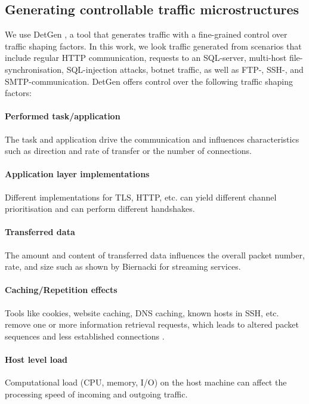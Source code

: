 \documentclass[conference]{IEEEtran}
\begin{document}
\subsection{Generating controllable traffic microstructures}\label{Control}

We use DetGen \cite{clausen2020traffic}, a tool that generates traffic with a fine-grained control over traffic shaping factors. In this work, we look traffic generated from scenarios that include regular HTTP communication, requests to an SQL-server, multi-host file-synchronisation, SQL-injection attacks, botnet traffic, as well as FTP-, SSH-, and SMTP-communication. DetGen offers control over the following traffic shaping factors:
 
\paragraph{Performed task/application}
The task and application drive the communication and influences characteristics such as direction and rate of transfer or the number of connections.%


\paragraph{Application layer implementations}
Different implementations for TLS, HTTP, etc. can yield different channel prioritisation and can perform different handshakes.

\paragraph{Transferred data} 
The amount and content of transferred data influences the overall packet number, rate, and size such as shown by Biernacki \cite{biernacki2017analysis} for streaming services.


\paragraph{Caching/Repetition effects}
Tools like cookies, website caching, DNS caching, known hosts in SSH, etc. remove one or more information retrieval requests, which leads to altered packet sequences and less established connections \cite{fricker2012impact}.


\paragraph{Host level load}
Computational load (CPU, memory, I/O) on the host machine can affect the processing speed of incoming and outgoing traffic.
\end{document}
